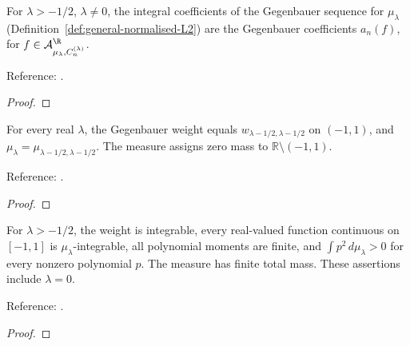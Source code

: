 \begin{supporting}

\begin{theorem}
\label{thm:gegenbauer-coefficients-general}
\leanok
For $\lambda>-1/2$, $\lambda\ne0$, the integral coefficients of the Gegenbauer
sequence for $\mu_\lambda$ (Definition~\ref{def:general-normalised-L2}) are the
Gegenbauer coefficients $a_n(f)$, for $f\in\mathcal A_{\mu_\lambda,C_n^{(\lambda)}}^{\R}$.

Reference: \cite[18.2(viii)]{dlmf}.
\end{theorem}
\begin{proof}
\leanok
\end{proof}

\begin{theorem}
\label{thm:gegenbauer-measure-bridge}
\leanok
For every real $\lambda$, the Gegenbauer weight equals
$w_{\lambda-1/2,\lambda-1/2}$ on $(-1,1)$, and
$\mu_\lambda=\mu_{\lambda-1/2,\lambda-1/2}$.
The measure assigns zero mass to $\mathbb{R}\setminus(-1,1)$.

Reference: \cite[Table 18.3.1]{dlmf}.
\end{theorem}
\begin{proof}
\leanok
\end{proof}

\begin{theorem}
\label{thm:gegenbauer-moments}
\leanok
For $\lambda>-1/2$, the weight is integrable, every real-valued function continuous on
$[-1,1]$ is $\mu_\lambda$-integrable, all polynomial moments are finite, and
$\int p^2\,d\mu_\lambda>0$ for every nonzero polynomial $p$.
The measure has finite total mass. These assertions include $\lambda=0$.

Reference: \cite[Table 18.3.1]{dlmf}.
\end{theorem}
\begin{proof}
\leanok
\end{proof}


\end{supporting}
